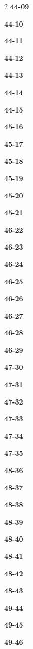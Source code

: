 \documentclass[10pt,a4paper]{article}
\begin{document}
\begin{multicols}{2}
\noindent\textbf{44-09}\ \par
\noindent\textbf{44-10}\ \par
\noindent\textbf{44-11}\ \par
\noindent\textbf{44-12}\ \par
\noindent\textbf{44-13}\ \par
\noindent\textbf{44-14}\ \par
\noindent\textbf{44-15}\ \par
\noindent\textbf{45-16}\ \par
\noindent\textbf{45-17}\ \par
\noindent\textbf{45-18}\ \par
\noindent\textbf{45-19}\ \par
\noindent\textbf{45-20}\ \par
\noindent\textbf{45-21}\ \par
\noindent\textbf{46-22}\ \par
\noindent\textbf{46-23}\ \par
\noindent\textbf{46-24}\ \par
\noindent\textbf{46-25}\ \par
\noindent\textbf{46-26}\ \par
\noindent\textbf{46-27}\ \par
\noindent\textbf{46-28}\ \par
\noindent\textbf{46-29}\ \par
\noindent\textbf{47-30}\ \par
\noindent\textbf{47-31}\ \par
\noindent\textbf{47-32}\ \par
\noindent\textbf{47-33}\ \par
\noindent\textbf{47-34}\ \par
\noindent\textbf{47-35}\ \par
\noindent\textbf{48-36}\ \par
\noindent\textbf{48-37}\ \par
\noindent\textbf{48-38}\ \par
\noindent\textbf{48-39}\ \par
\noindent\textbf{48-40}\ \par
\noindent\textbf{48-41}\ \par
\noindent\textbf{48-42}\ \par
\noindent\textbf{48-43}\ \par
\noindent\textbf{49-44}\ \par
\noindent\textbf{49-45}\ \par
\noindent\textbf{49-46}\ \par

\end{multicols}
\end{document}
